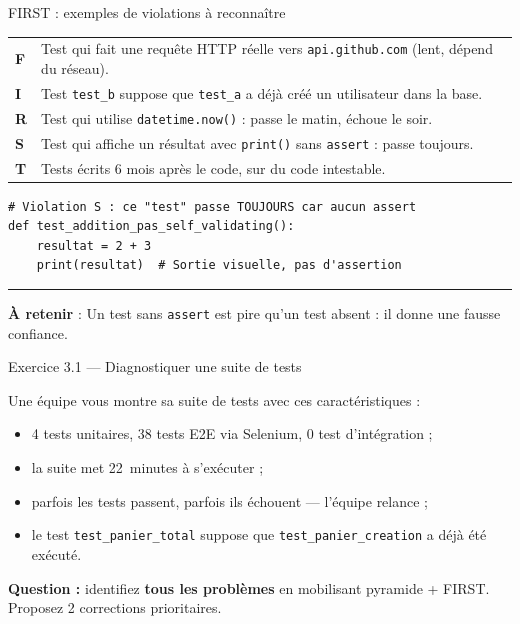 \documentclass[aspectratio=169,11pt]{beamer}
\newcommand{\takeaway}[1]{%
\vfill\begin{beamercolorbox}[wd=\linewidth,sep=0.4em]{}
\color{accent2}\rule[0.6ex]{1.2em}{1.2pt}\hspace{0.4em}%
\textbf{\color{accent2}\small À retenir} \textcolor{textsoft}{:} %
{\small\color{textmain}#1}
\end{beamercolorbox}}
\begin{document}
\begin{frame}[fragile,t]{FIRST : exemples de violations à reconnaître}
\footnotesize
\begin{tabular}{@{}p{1.2cm} p{10.4cm}@{}}
\toprule
\textbf{F} & Test qui fait une requête HTTP réelle vers \texttt{api.github.com} (lent, dépend du réseau).\\
\textbf{I} & Test \texttt{test\_b} suppose que \texttt{test\_a} a déjà créé un utilisateur dans la base.\\
\textbf{R} & Test qui utilise \texttt{datetime.now()} : passe le matin, échoue le soir.\\
\textbf{S} & Test qui affiche un résultat avec \texttt{print()} sans \texttt{assert} : passe toujours.\\
\textbf{T} & Tests écrits 6 mois après le code, sur du code intestable.\\
\bottomrule
\end{tabular}
\vspace{0.4cm}
\begin{lstlisting}[style=pythondark]
# Violation S : ce "test" passe TOUJOURS car aucun assert
def test_addition_pas_self_validating():
    resultat = 2 + 3
    print(resultat)  # Sortie visuelle, pas d'assertion
\end{lstlisting}
\takeaway{Un test sans \texttt{assert} est pire qu'un test absent : il donne une fausse confiance.}
\end{frame}

\begin{frame}[t]{Exercice 3.1 --- Diagnostiquer une suite de tests}
\begin{exercice}
Une équipe vous montre sa suite de tests avec ces caractéristiques :\\[0.3em]
\begin{itemize}\footnotesize
\item 4 tests unitaires, 38 tests E2E via Selenium, 0 test d'intégration ;
\item la suite met 22~minutes à s'exécuter ;
\item parfois les tests passent, parfois ils échouent --- l'équipe relance ;
\item le test \texttt{test\_panier\_total} suppose que \texttt{test\_panier\_creation} a déjà été exécuté.
\end{itemize}
\vspace{0.3em}
\textbf{Question :} identifiez \textbf{tous les problèmes} en mobilisant pyramide + FIRST. Proposez 2 corrections prioritaires.
\end{exercice}
\end{frame}
\end{document}
